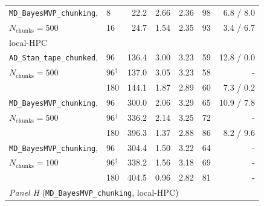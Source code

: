 \begin{table}[H]
{\begin{tabular}{llrrrrr}
\texttt{MD\_BayesMVP\_chunking}, & 8 & 22.2 & 2.66 & 2.36 & 98 & 6.8 / 8.0 \\
$N_{\text{chunks}} = 500$ & 16 & 24.7 & 1.54 & 2.35 & 93 & 3.4 / 6.7 \\
\multicolumn{7}{l}{local-HPC} \\
\texttt{AD\_Stan\_tape\_chunked}, & 96 & 136.4 & 3.00 & 3.23 & 59 & 12.8 / 0.0 \\
$N_{\text{chunks}} = 500$ & 96$^{\dagger}$ & 137.0 & 3.05 & 3.23 & 58 & - \\
 & 180 & 144.1 & 1.87 & 2.89 & 60 & 7.3 / 0.2 \\
\texttt{MD\_BayesMVP\_chunking}, & 96 & 300.0 & 2.06 & 3.29 & 65 & 10.9 / 7.8 \\
$N_{\text{chunks}} = 500$ & 96$^{\dagger}$ & 336.2 & 2.14 & 3.25 & 72 & - \\
 & 180 & 396.3 & 1.37 & 2.88 & 86 & 8.2 / 9.6 \\
\texttt{MD\_BayesMVP\_chunking}, & 96 & 304.4 & 1.50 & 3.22 & 64 & - \\
$N_{\text{chunks}} = 100$ & 96$^{\dagger}$ & 338.2 & 1.56 & 3.18 & 69 & - \\
 & 180 & 404.5 & 0.96 & 2.82 & 81 & - \\
\hline
\multicolumn{7}{l}{\textit{Panel H} (\texttt{MD\_BayesMVP\_chunking}, local-HPC)} \\

\end{tabular}}
\end{table}
